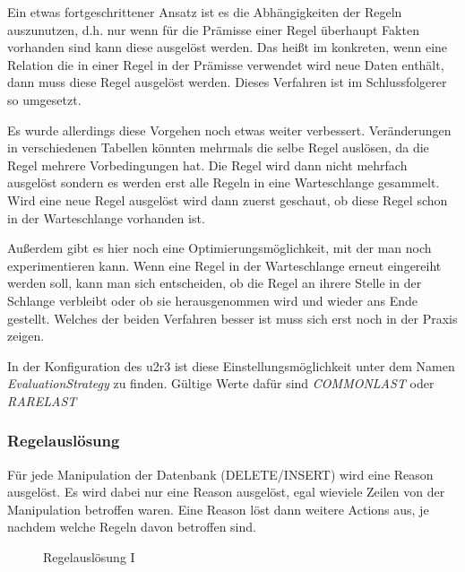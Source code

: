 Ein etwas fortgeschrittener Ansatz ist es die Abhängigkeiten der Regeln auszunutzen, d.h. nur wenn für die Prämisse einer Regel überhaupt Fakten vorhanden sind kann diese ausgelöst werden. Das heißt im konkreten, wenn eine Relation die in einer Regel in der Prämisse verwendet wird neue Daten enthält, dann muss diese Regel ausgelöst werden. Dieses Verfahren ist im Schlussfolgerer so umgesetzt.

Es wurde allerdings diese Vorgehen noch etwas weiter verbessert. Veränderungen in verschiedenen Tabellen könnten mehrmals die selbe Regel auslösen, da die Regel mehrere Vorbedingungen  hat. Die Regel wird dann nicht mehrfach ausgelöst sondern es werden erst alle Regeln in eine Warteschlange gesammelt. Wird eine neue Regel ausgelöst wird dann zuerst geschaut, ob diese Regel schon in der Warteschlange vorhanden ist.

Außerdem gibt es hier noch eine Optimierungsmöglichkeit, mit der man noch experimentieren kann. Wenn eine Regel in der Warteschlange erneut eingereiht werden soll, kann man sich entscheiden, ob die Regel an ihrere Stelle in der Schlange verbleibt oder ob sie herausgenommen wird und wieder ans Ende gestellt. Welches der beiden Verfahren besser ist muss sich erst noch in der Praxis zeigen.

In der Konfiguration des u2r3 ist diese Einstellungsmöglichkeit unter dem Namen \emph{EvaluationStrategy} zu finden. Gültige Werte dafür sind \emph{COMMONLAST} oder \emph{RARELAST}

\subsubsection{Regelauslösung}
Für jede Manipulation der Datenbank (DELETE/INSERT) wird eine Reason ausgelöst. Es wird dabei nur eine Reason ausgelöst, egal wieviele Zeilen von der Manipulation betroffen waren. Eine Reason löst dann weitere Actions aus, je nachdem welche Regeln davon betroffen sind.

\begin{figure}[htp]
\begin{center}
  \caption{Regelauslösung I}
  \label{diagram-ruleexecution1}
\end{center}
\end{figure}

